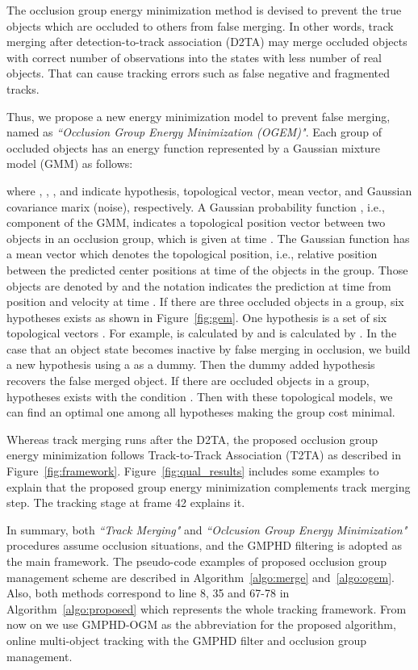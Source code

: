 \documentclass[journal]{IEEEtran}
\newcounter{ct}
\begin{document}
The occlusion group energy minimization method is devised to prevent the true objects which are occluded to others from false merging. In other words, track merging after detection-to-track association (D2TA) may merge occluded objects with correct number of observations into the states with less number of real objects. That can cause tracking errors such as false negative and fragmented tracks. 

Thus, we propose a new energy minimization model to prevent false merging, named as \textit{``Occlusion Group Energy Minimization (OGEM)"}. Each group of occluded objects has an energy function represented by a Gaussian mixture model (GMM) as follows:

where , , , and  indicate hypothesis, topological vector, mean vector, and Gaussian covariance marix (noise), respectively. A Gaussian probability function , i.e., component of the GMM, indicates a topological position vector between two objects in an occlusion group, which is given at time . The Gaussian function has a mean vector  which denotes the topological position, i.e., relative position between the predicted center positions at time  of the objects in the group. Those objects are denoted by  and the notation  indicates the prediction at time  from position and velocity at time . 
If there are three occluded objects in a group, six hypotheses exists as shown in Figure~\ref{fig:gem}. One hypothesis is a set of six topological vectors . For example,  is calculated by  and  is calculated by . In the case that an object state  becomes inactive by false merging in occlusion, we build a new hypothesis using a as a dummy. Then the dummy added hypothesis recovers the false merged object.
If there are  occluded objects in a group,  hypotheses exists with the condition .
Then with these topological models, we can find an optimal one among all hypotheses making the group cost minimal.

Whereas track merging runs after the D2TA, the proposed occlusion group energy minimization follows Track-to-Track Association (T2TA) as described in Figure~\ref{fig:framework}.
Figure~\ref{fig:qual_results} includes some examples to explain that the proposed group energy minimization complements track merging step. The tracking stage at frame 42 explains it.

In summary, both \textit{``Track Merging"} and \textit{``Oclcusion Group Energy Minimization"} procedures assume occlusion situations, and the GMPHD filtering is adopted as the main framework. The pseudo-code examples of proposed occlusion group management scheme are described in Algorithm~\ref{algo:merge} and~\ref{algo:ogem}. Also, both methods correspond to line 8, 35 and 67-78 in Algorithm~\ref{algo:proposed} which represents the whole tracking framework.
From now on we use GMPHD-OGM as the abbreviation for the proposed algorithm, online multi-object tracking with the GMPHD filter and occlusion group management.
\end{document}
